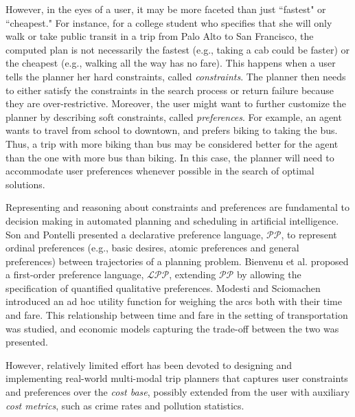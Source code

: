 \documentclass[letterpaper]{article}
\newcommand{\tit}[1]{\textit{#1}}
\begin{document}
However, in the eyes of a user, it may be more faceted than just
``fastest" or ``cheapest."
For instance, for a college student who specifies that she will
only walk or take public transit in a trip from Palo Alto to
San Francisco, the computed plan is not necessarily the fastest
(e.g., taking a cab could be faster)
or the cheapest (e.g., walking all the way has no fare).
This happens when a user tells the planner her hard constraints,
called \tit{constraints}.  
The planner then needs to either satisfy the 
constraints in the search process or return failure because they are
over-restrictive.
Moreover, the user might want to further customize the planner by
describing soft constraints, called \tit{preferences}.
For example, an agent wants to travel from school to
downtown, and prefers biking to taking the bus.
Thus, a trip with more biking than bus may be considered better for
the agent than the one with more bus than biking.
In this case, the planner will need to accommodate user preferences
whenever possible in the search of optimal solutions.

Representing and reasoning about constraints and preferences are
fundamental to decision making in automated planning and scheduling
in artificial intelligence.
Son and Pontelli presented a declarative preference language, 
$\mathcal{PP}$, to represent ordinal preferences (e.g., basic desires,
atomic preferences and general preferences) between trajectories of 
a planning problem\cite{son2004planning}.
Bienvenu et al. proposed a first-order preference language, $\mathcal{LPP}$, 
extending $\mathcal{PP}$ by allowing the specification of quantified qualitative
preferences\cite{bienvenu2011specifying}.
Modesti and Sciomachen introduced an ad hoc utility function for weighing
the arcs both with their time and fare\cite{modesti1998utility}.
This relationship between time and fare in the setting of transportation
was studied, and economic models capturing the trade-off between the two
was presented\cite{antoniou2007methodology}.

However, relatively limited effort has been devoted to designing and
implementing real-world multi-modal trip planners that captures user
constraints and preferences over the \tit{cost base}, possibly
extended from the user with auxiliary \tit{cost metrics},
such as crime rates and pollution statistics.
\end{document}
